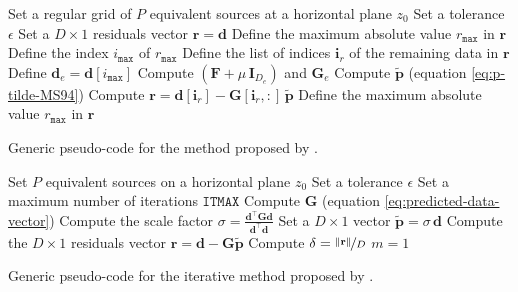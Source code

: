 \begin{algorithm}
	\Input{}
	Set a regular grid of $P$ equivalent sources at a horizontal plane $z_{0}$ \;
	Set a tolerance $\epsilon$ \;
	Set a $D \times 1$ residuals vector $\mathbf{r} = \mathbf{d}$ \;
	Define the maximum absolute value $r_{\mathtt{max}}$ in $\mathbf{r}$ \; 
	Define the index $i_{\mathtt{max}}$ of $r_{\mathtt{max}}$ \;
	Define the list of indices $\mathbf{i}_{r}$ of the remaining data in $\mathbf{r}$ \;
	Define $\mathbf{d}_{e} = \mathbf{d}[i_{\mathtt{max}}] $ \;
	Compute $\left(\mathbf{F} + \mu \, \mathbf{I}_{D_{e}} \right)$ and $\mathbf{G}_{e}$ \;
	Compute $\tilde{\mathbf{p}}$ (equation \ref{eq:p-tilde-MS94}) \;
	Compute $\mathbf{r} = \mathbf{d}[\mathbf{i}_{r}] - \mathbf{G}[\mathbf{i}_{r}, :] \, \tilde{\mathbf{p}}$ \;
	Define the maximum absolute value $r_{\mathtt{max}}$ in $\mathbf{r}$ \; 
	\caption{Generic pseudo-code for the method proposed by \cite{mendonca-silva1994}.}
	\label{alg:MS94}
\end{algorithm}


\begin{algorithm}
	\Input{}
	Set $P$ equivalent sources on a horizontal plane $z_{0}$ \;
	Set a tolerance $\epsilon$ \;
	Set a maximum number of iterations $\mathtt{ITMAX}$ \;
	Compute $\mathbf{G}$ (equation \ref{eq:predicted-data-vector}) \;
	Compute the scale factor $\sigma = \frac{\mathbf{d}^{\top} \mathbf{G}\mathbf{d}}{\mathbf{d}^{\top}\mathbf{d}}$\;
	Set a $D \times 1$ vector $\tilde{\mathbf{p}} = \sigma \, \mathbf{d}$ \;
	Compute the $D \times 1$ residuals vector $\mathbf{r} = \mathbf{d} - \mathbf{G} \tilde{\mathbf{p}}$ \;
	Compute $\delta = \nicefrac{\| \mathbf{r} \|}{D}$ \;
	$m = 1$\;
	\caption{Generic pseudo-code for the iterative method proposed by \cite{siqueira-etal2017}.}
	\label{alg:SOB17}
\end{algorithm}

